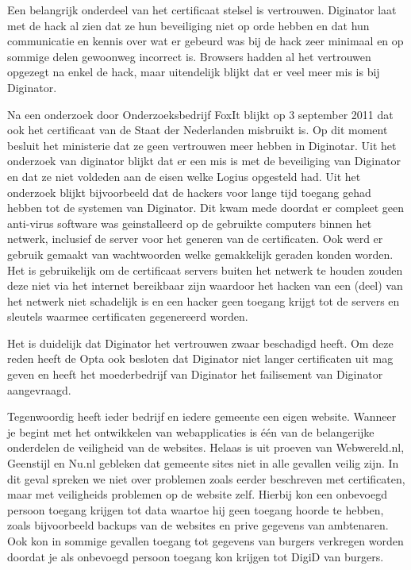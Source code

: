 Een belangrijk onderdeel van het certificaat stelsel is vertrouwen. Diginator laat met de hack al zien dat ze hun beveiliging niet op orde hebben en dat hun communicatie en kennis over wat er gebeurd was bij de hack zeer minimaal en op sommige delen gewoonweg incorrect is. Browsers hadden al het vertrouwen opgezegt na enkel de hack, maar uitendelijk blijkt dat er veel meer mis is bij Diginator. 

Na een onderzoek door Onderzoeksbedrijf FoxIt blijkt op 3 september 2011 dat ook het certificaat van de Staat der Nederlanden misbruikt is\cite{bib.foxit}. Op dit moment besluit het ministerie dat ze geen vertrouwen meer hebben in Diginotar\cite{bib.webwereld.diginator4}. Uit het onderzoek van diginator blijkt dat er een mis is met de beveiliging van Diginator en dat ze niet voldeden aan de eisen welke Logius opgesteld had. Uit het onderzoek blijkt bijvoorbeeld dat de hackers voor lange tijd toegang gehad hebben tot de systemen van Diginator. Dit kwam mede doordat er compleet geen anti-virus software was geinstalleerd op de gebruikte computers binnen het netwerk, inclusief de server voor het generen van de certificaten. Ook werd er gebruik gemaakt van wachtwoorden welke gemakkelijk geraden konden worden. 
Het is gebruikelijk om de certificaat servers buiten het netwerk te houden zouden deze niet via het internet bereikbaar zijn waardoor het hacken van een (deel) van het netwerk niet schadelijk is en een hacker geen toegang krijgt tot de servers en sleutels waarmee certificaten gegenereerd worden.

Het is duidelijk dat Diginator het vertrouwen zwaar beschadigd heeft. Om deze reden heeft de Opta ook besloten dat Diginator niet langer certificaten uit mag geven en heeft het moederbedrijf van Diginator het failisement van Diginator aangevraagd.

Tegenwoordig heeft ieder bedrijf en iedere gemeente een eigen website. Wanneer je begint met het ontwikkelen van webapplicaties is \'{e}\'{e}n van de belangerijke onderdelen de veiligheid van de websites. Helaas is uit proeven van Webwereld.nl, Geenstijl en Nu.nl gebleken dat gemeente sites niet in alle gevallen veilig zijn\cite{bib.tweakers.gemeente}. In dit geval spreken we niet over problemen zoals eerder beschreven met certificaten, maar met veiligheids problemen op de website zelf. Hierbij kon een onbevoegd persoon toegang krijgen tot data waartoe hij geen toegang hoorde te hebben, zoals bijvoorbeeld backups van de websites en prive gegevens van ambtenaren. Ook kon in sommige gevallen toegang tot gegevens van burgers verkregen worden doordat je als onbevoegd persoon toegang kon krijgen tot DigiD van burgers. 

